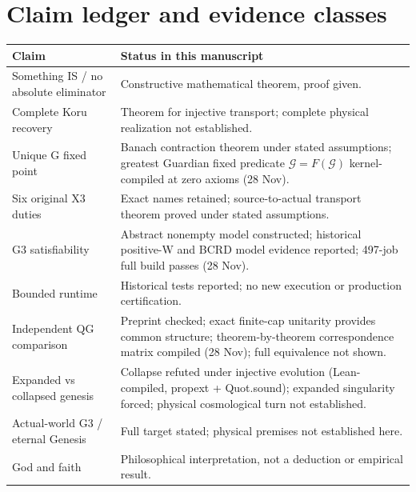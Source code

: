 \documentclass[11pt,a4paper]{article}
\begin{document}
\section{Claim ledger and evidence classes}
\small
\begin{tabularx}{\linewidth}{@{}p{43mm}X@{}}\toprule
Claim & Status in this manuscript\\\midrule
Something IS / no absolute eliminator & Constructive mathematical theorem, proof given.\\
Complete Koru recovery & Theorem for injective transport; complete physical realization not established.\\
Unique G fixed point & Banach contraction theorem under stated assumptions; greatest Guardian fixed predicate $\mathcal{G}=F(\mathcal{G})$ kernel-compiled at zero axioms (28 Nov).\\
Six original X3 duties & Exact names retained; source-to-actual transport theorem proved under stated assumptions.\\
G3 satisfiability & Abstract nonempty model constructed; historical positive-W and BCRD model evidence reported; 497-job full build passes (28 Nov).\\
Bounded runtime & Historical tests reported; no new execution or production certification.\\
Independent QG comparison & Preprint checked; exact finite-cap unitarity provides common structure; theorem-by-theorem correspondence matrix compiled (28 Nov); full equivalence not shown.\\
Expanded vs collapsed genesis & Collapse refuted under injective evolution (Lean-compiled, propext + Quot.sound); expanded singularity forced; physical cosmological turn not established.\\
Actual-world G3 / eternal Genesis & Full target stated; physical premises not established here.\\
God and faith & Philosophical interpretation, not a deduction or empirical result.\\\bottomrule
\end{tabularx}
\normalsize
\end{document}
